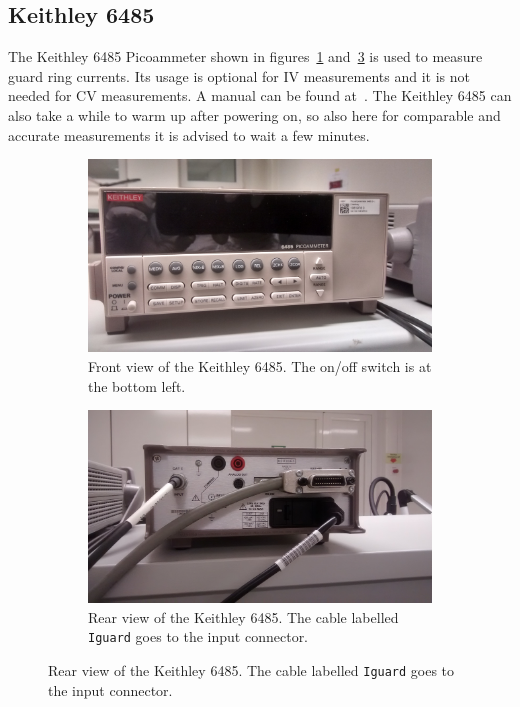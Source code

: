 \documentclass[a4paper]{article}
\begin{document}
\subsection{Keithley 6485}
\label{sec:keithley6485}

The Keithley 6485 Picoammeter shown in figures~\ref{fig:keithley6485front} and~\ref{fig:keithley6485rear} is used to measure guard ring currents.
Its usage is optional for IV measurements and it is not needed for CV measurements.
A manual can be found at~\cite{ref:keithley6485ref}.
The Keithley 6485 can also take a while to warm up after powering on, so also here for comparable and accurate measurements it is advised to wait a few minutes.\\

\begin{figure}[hbtp]
\centering
\begin{subfigure}[t]{0.475\textwidth}
\centering\captionsetup{width=.8\linewidth}%
\includegraphics[width=\linewidth]{pictures/front_keithley64.jpg}
\caption[Front View of the Keithley 6485]{Front view of the Keithley 6485. The on/off switch is at the bottom left.}
\label{fig:keithley6485front}
\end{subfigure}
\begin{subfigure}[t]{0.475\textwidth}
\centering\captionsetup{width=.8\linewidth}%
\includegraphics[width=\linewidth]{pictures/back_keithley64.jpg}
\caption[Back View of the Keithley 6485]{Rear view of the Keithley 6485. The cable labelled {\tt Iguard} goes to the input connector.}
\label{fig:keithley6485rear}
\end{subfigure}
\end{figure}
\end{document}
